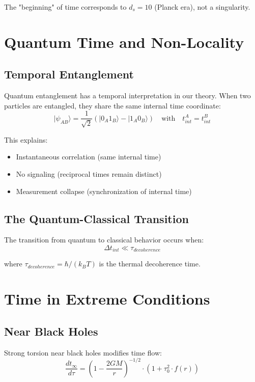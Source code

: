 The "beginning" of time corresponds to $d_s = 10$ (Planck era), not a singularity.

\section{Quantum Time and Non-Locality}

\subsection{Temporal Entanglement}

Quantum entanglement has a temporal interpretation in our theory. When two particles are entangled, they share the same internal time coordinate:
\begin{equation}
    |\psi_{AB}\rangle = \frac{1}{\sqrt{2}}(|0_A 1_B\rangle - |1_A 0_B\rangle) \quad \text{with} \quad t_{int}^A = t_{int}^B
\end{equation}

This explains:
\begin{itemize}
    \item Instantaneous correlation (same internal time)
    \item No signaling (reciprocal times remain distinct)
    \item Measurement collapse (synchronization of internal time)
\end{itemize}

\subsection{The Quantum-Classical Transition}

The transition from quantum to classical behavior occurs when:
\begin{equation}
    \Delta t_{int} \ll \tau_{decoherence}
\end{equation}

where $\tau_{decoherence} = \hbar/(k_B T)$ is the thermal decoherence time.

\section{Time in Extreme Conditions}

\subsection{Near Black Holes}

Strong torsion near black holes modifies time flow:
\begin{equation}
    \frac{dt_{\infty}}{d\tau} = \left(1 - \frac{2GM}{r}\right)^{-1/2} \cdot (1 + \tau_0^2 \cdot f(r))
\end{equation}


